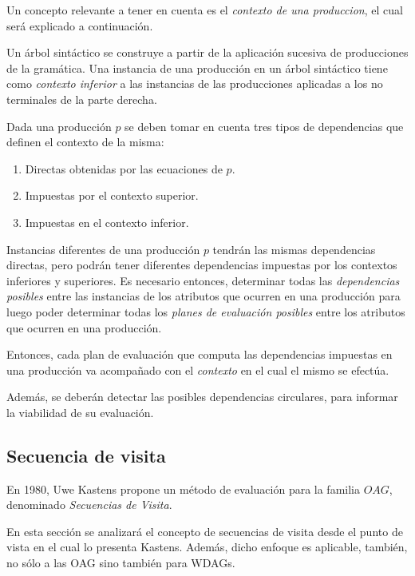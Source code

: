 \documentclass[runningheads,a4paper]{llncs}
\begin{document}
Un concepto relevante a tener en cuenta es el \textit{contexto de una produccion}, el cual será explicado a continuación.

Un árbol sintáctico se construye a partir de la aplicación sucesiva de producciones de la gramática. Una instancia de una producción en un árbol sintáctico tiene como \emph{contexto inferior} a las instancias de las producciones aplicadas a los no terminales de la parte derecha.

Dada una producción $p$ se deben tomar en cuenta tres tipos de dependencias que definen el contexto de la misma:
\begin{enumerate}
\item Directas obtenidas por las ecuaciones de $p$.
\item Impuestas por el contexto superior.
\item Impuestas en el contexto inferior.
\end{enumerate}

Instancias diferentes de una producción $p$ tendrán las mismas dependencias directas, pero podrán tener diferentes dependencias impuestas por los contextos inferiores y superiores. Es necesario entonces, determinar todas las \emph{dependencias posibles} entre las instancias de los atributos que ocurren en una producción para luego poder determinar todas los \emph{planes de evaluación posibles} entre los atributos que ocurren en una producción.

Entonces, cada plan de evaluación que computa las dependencias impuestas en una producción va acompañado con el \textit{contexto} en el cual el mismo se efectúa.

Además, se deberán detectar las posibles dependencias circulares, para informar la viabilidad de su evaluación.


\subsection{Secuencia de visita}
\label{sec:sec-visit}
En 1980, Uwe Kastens propone un método de evaluación para la familia $OAG$, denominado \emph{Secuencias de Visita}\cite{kastens}.

En esta sección se analizará el concepto de secuencias de visita desde el punto de vista en el cual lo presenta Kastens. Además, dicho enfoque es aplicable, también, no sólo a las OAG sino también para WDAGs.
\end{document}

